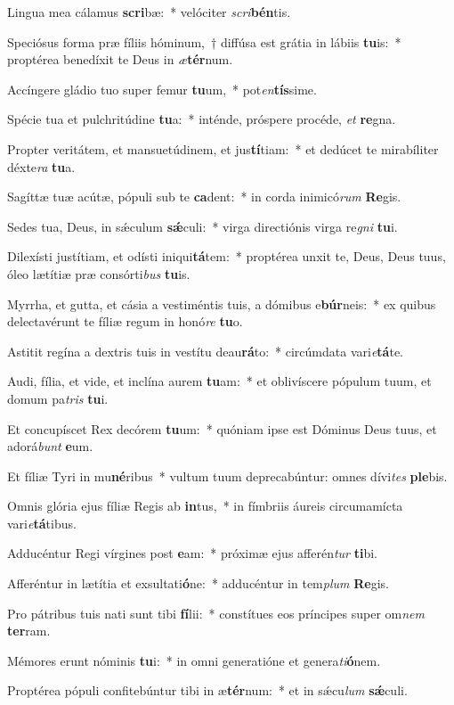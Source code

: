 \item Lingua mea cálamus \textbf{scri}bæ:~* velóciter \textit{scri}\textbf{bén}tis.
\item Speciósus forma præ fíliis hóminum,~† diffúsa est grátia in lábiis \textbf{tu}is:~* proptérea benedíxit te Deus in \textit{æ}\textbf{tér}num.
\item Accíngere gládio tuo super femur \textbf{tu}um,~* pot\textit{en}\textbf{tís}sime.
\item Spécie tua et pulchritúdine \textbf{tu}a:~* inténde, próspere procéde, \textit{et} \textbf{re}gna.
\item Propter veritátem, et mansuetúdinem, et jus\textbf{tí}tiam:~* et dedúcet te mirabíliter déxte\textit{ra} \textbf{tu}a.
\item Sagíttæ tuæ acútæ, pópuli sub te \textbf{ca}dent:~* in corda inimicó\textit{rum} \textbf{Re}gis.
\item Sedes tua, Deus, in sǽculum \textbf{sǽ}culi:~* virga directiónis virga re\textit{gni} \textbf{tu}i.
\item Dilexísti justítiam, et odísti iniqui\textbf{tá}tem:~* proptérea unxit te, Deus, Deus tuus, óleo lætítiæ præ consórti\textit{bus} \textbf{tu}is.
\item Myrrha, et gutta, et cásia a vestiméntis tuis, a dómibus e\textbf{búr}neis:~* ex quibus delectavérunt te fíliæ regum in honó\textit{re} \textbf{tu}o.
\item Astitit regína a dextris tuis in vestítu deau\textbf{rá}to:~* circúmdata vari\textit{e}\textbf{tá}te.
\item Audi, fília, et vide, et inclína aurem \textbf{tu}am:~* et oblivíscere pópulum tuum, et domum pa\textit{tris} \textbf{tu}i.
\item Et concupíscet Rex decórem \textbf{tu}um:~* quóniam ipse est Dóminus Deus tuus, et adorá\textit{bunt} \textbf{e}um.
\item Et fíliæ Tyri in mu\textbf{né}ribus~* vultum tuum deprecabúntur: omnes dívi\textit{tes} \textbf{ple}bis.
\item Omnis glória ejus fíliæ Regis ab \textbf{in}tus,~* in fímbriis áureis circumamícta vari\textit{e}\textbf{tá}tibus.
\item Adducéntur Regi vírgines post \textbf{e}am:~* próximæ ejus afferén\textit{tur} \textbf{ti}bi.
\item Afferéntur in lætítia et exsultati\textbf{ó}ne:~* adducéntur in tem\textit{plum} \textbf{Re}gis.
\item Pro pátribus tuis nati sunt tibi \textbf{fí}lii:~* constítues eos príncipes super om\textit{nem} \textbf{ter}ram.
\item Mémores erunt nóminis \textbf{tu}i:~* in omni generatióne et genera\textit{ti}\textbf{ó}nem.
\item Proptérea pópuli confitebúntur tibi in æ\textbf{tér}num:~* et in sǽcu\textit{lum} \textbf{sǽ}culi.
